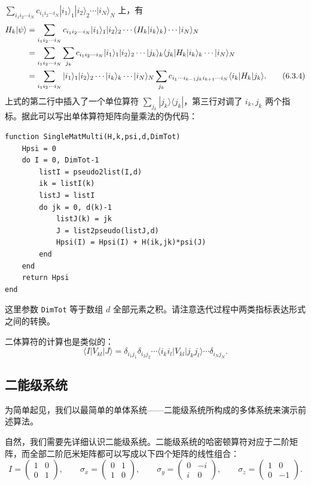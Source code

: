 $\sum_{i_1i_2\cdots i_N}c_{i_1i_2\cdots i_N}|i_1\rangle_1|i_2\rangle_2\cdots|i_N\rangle_N$ 上，有
\begin{align}
 H_k|\psi\rangle
 & = \sum_{i_1i_2\cdots i_N}c_{i_1i_2\cdots i_N}|i_1\rangle_1|i_2\rangle_2\cdots(H_k|i_k\rangle_k)\cdots|i_N\rangle_N\notag\\
 & = \sum_{i_1i_2\cdots i_N}\sum_{j_k}c_{i_1i_2\cdots i_N}|i_1\rangle_1|i_2\rangle_2\cdots|j_k\rangle_k\langle j_k|H_k|i_k\rangle_k\cdots|i_N\rangle_N\notag\\
 & = \sum_{i_1i_2\cdots i_N}|i_1\rangle_1|i_2\rangle_2\cdots|i_k\rangle_k\cdots|i_N\rangle_N
 \sum_{j_k}c_{i_1\cdots i_{k-1}j_ki_{k+1}\cdots i_N}\langle i_k|H_k|j_k\rangle.
\tag{6.3.4}
\end{align}
上式的第二行中插入了一个单位算符 $\sum_{j_k}|j_k\rangle\langle j_k|$，第三行对调了 $i_k,j_k$ 两个指标。据此可以写出单体算符矩阵向量乘法的伪代码：

\begin{lstlisting}[style=bellacode]
function SingleMatMulti(H,k,psi,d,DimTot)
    Hpsi = 0
    do I = 0, DimTot-1
        listI = pseudo2list(I,d)
        ik = listI(k)
        listJ = listI
        do jk = 0, d(k)-1
            listJ(k) = jk
            J = list2pseudo(listJ,d)
            Hpsi(I) = Hpsi(I) + H(ik,jk)*psi(J)
        end
    end
    return Hpsi
end
\end{lstlisting}

这里参数 \texttt{DimTot} 等于数组 $d$ 全部元素之积。请注意迭代过程中两类指标表达形式之间的转换。

二体算符的计算也是类似的：
\begin{equation}
 \langle I|V_{kl}|J\rangle
 =\delta_{i_1j_1}\delta_{i_2j_2}\cdots\langle i_ki_l|V_{kl}|j_kj_l\rangle\cdots\delta_{i_Nj_N}.
\tag{6.3.5}
\end{equation}

\subsection{二能级系统}

为简单起见，我们以最简单的单体系统——二能级系统所构成的多体系统来演示前述算法。

自然，我们需要先详细认识二能级系统。二能级系统的哈密顿算符对应于二阶矩阵，而全部二阶厄米矩阵都可以写成以下四个矩阵的线性组合：
\begin{equation}
 I=\begin{pmatrix}1&0\\0&1\end{pmatrix},\qquad
 \sigma_x=\begin{pmatrix}0&1\\1&0\end{pmatrix},\qquad
 \sigma_y=\begin{pmatrix}0&-i\\ i&0\end{pmatrix},\qquad
 \sigma_z=\begin{pmatrix}1&0\\0&-1\end{pmatrix}.
\tag{6.3.6}
\end{equation}

